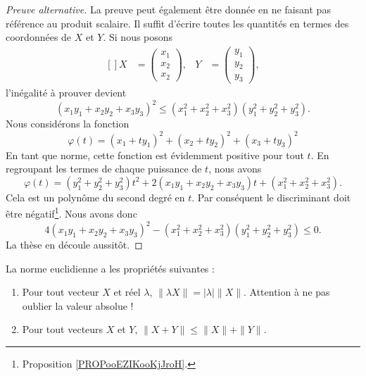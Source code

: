\begin{proof}[Preuve alternative]
	La preuve peut également être donnée en ne faisant pas référence au produit scalaire. Il suffit d'écrire toutes les quantités en termes des coordonnées de $X$ et $Y$. Si nous posons
	\begin{equation}
		\begin{aligned}[]
			X&=\begin{pmatrix}
				x_1	\\
				x_2	\\
				x_2
			\end{pmatrix},
			&Y&=\begin{pmatrix}
				y_1	\\
				y_2	\\
				y_3
			\end{pmatrix},
		\end{aligned}
	\end{equation}
	l'inégalité à prouver devient
	\begin{equation}
		(x_1y_1+x_2y_2+x_3y_3)^2\leq (x_1^2+x_2^2+x_3^2)(y_1^2+y_2^2+y_3^2).
	\end{equation}
	Nous considérons la fonction
	\begin{equation}
		\varphi(t)=(x_1+ty_1)^2+(x_2+ty_2)^2+(x_3+ty_3)^2
	\end{equation}
	En tant que norme, cette fonction est évidemment positive pour tout $t$. En regroupant les termes de chaque puissance de $t$, nous avons
	\begin{equation}
		\varphi(t)=(y_1^2+y_2^2+y_3^2)t^2+2(x_1y_1+x_2y_2+x_3y_3)t+(x_1^2+x_2^2+x_3^2).
	\end{equation}
    Cela est un polynôme du second degré en $t$. Par conséquent le discriminant doit être négatif\footnote{Proposition \ref{PROPooEZIKooKjJroH}.}. Nous avons donc
	\begin{equation}
		4(x_1y_1+x_2y_2+x_3y_3)^2-(x_1^2+x_2^2+x_3^2)(y_1^2+y_2^2+y_3^2)\leq 0.
	\end{equation}
	La thèse en découle aussitôt.
\end{proof}

\begin{proposition}     \label{PROPooVSVMooZrqxdc}
	La norme euclidienne a les propriétés suivantes :
	\begin{enumerate}
		\item
			Pour tout vecteur $X$ et réel $\lambda$,  $\| \lambda X \|=| \lambda |\| X \|$. Attention à ne pas oublier la valeur absolue !
		\item
			Pour tout vecteurs $X$ et $Y$, $\| X+Y \|\leq \| X \|+\| Y \|$.
	\end{enumerate}
\end{proposition}

